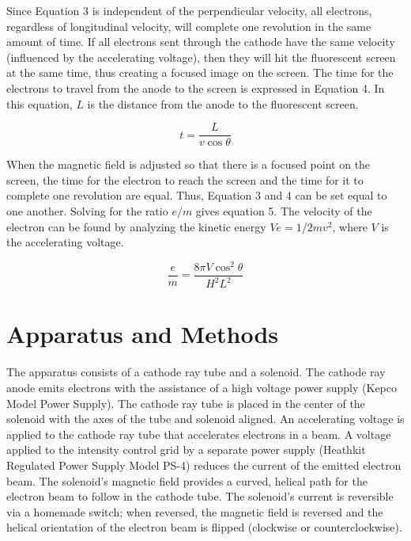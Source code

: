 \documentclass[%
 aip,
 amsmath,amssymb,
 reprint,%
floatfix,
]{revtex4-1}
\begin{document}
\noindent Since Equation 3 is independent of the perpendicular velocity, all electrons, regardless of longitudinal velocity, will complete one revolution in the same amount of time. If all electrons sent through the cathode have the same velocity (influenced by the accelerating voltage), then they will hit the fluorescent screen at the same time, thus creating a focused image on the screen. The time for the electrons to travel from the anode to the screen is expressed in Equation 4. In this equation, $L$ is the distance from the anode to the fluorescent screen.

\begin{equation}
	t = \frac{L}{v \cos{\theta}}
\end{equation}

\noindent When the magnetic field is adjusted so that there is a focused point on the screen, the time for the electron to reach the screen and the time for it to complete one revolution are equal. Thus, Equation 3 and 4 can be set equal to one another. Solving for the ratio $e/m$ gives equation 5. The velocity of the electron can be found by analyzing the kinetic energy $V e = 1/2 m v^2$, where $V$ is the accelerating voltage.

\begin{equation}
	\frac{e}{m} = \frac{8 \pi V \cos^2{\theta}}{H^2 L^2}
\end{equation}



\section{\label{sec:level3}Apparatus and Methods}

The apparatus consists of a cathode ray tube and a solenoid. The cathode ray anode emits electrons with the assistance of a high voltage power supply (Kepco Model Power Supply). The cathode ray tube is placed in the center of the solenoid with the axes of the tube and solenoid aligned. An accelerating voltage is applied to the cathode ray tube that accelerates electrons in a beam. A voltage applied to the intensity control grid by a separate power supply (Heathkit Regulated Power Supply Model PS-4) reduces the current of the emitted electron beam. The solenoid's magnetic field provides a curved, helical path for the electron beam to follow in the cathode tube. The solenoid's current is reversible via a homemade switch; when reversed, the magnetic field is reversed and the helical orientation of the electron beam is flipped (clockwise or counterclockwise).
\end{document}
